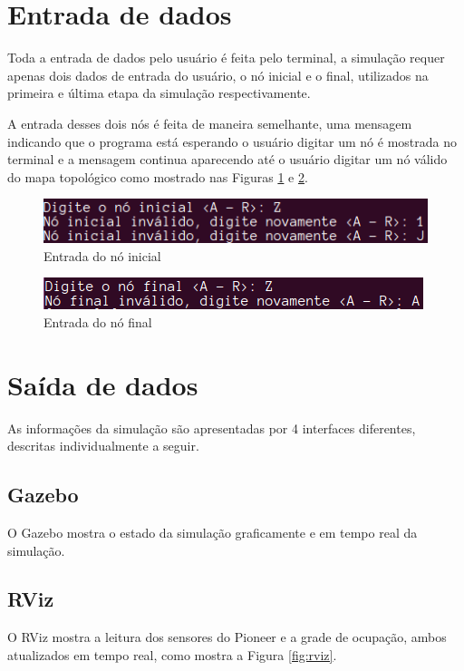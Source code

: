 \documentclass{llncs}
\begin{document}
\section{Entrada de dados} \label{sec:entrada}
Toda a entrada de dados pelo usuário é feita pelo terminal, a simulação requer apenas dois dados de entrada do usuário, o nó inicial e o final, utilizados na primeira e última etapa da simulação respectivamente.

A entrada desses dois nós é feita de maneira semelhante, uma mensagem indicando que o programa está esperando o usuário digitar um nó é mostrada no terminal e a mensagem continua aparecendo até o usuário digitar um nó válido do mapa topológico como mostrado nas Figuras \ref{fig:inicial} e \ref{fig:final}.

\begin{figure}[h]
	\centering
	\includegraphics[scale=0.75]{no_inicial}
	\caption{Entrada do nó inicial}
	\label{fig:inicial}
\end{figure}
\begin{figure}[h]
	\centering
	\includegraphics[scale=0.75]{no_final}
	\caption{Entrada do nó final}
	\label{fig:final}
\end{figure}


\section{Saída de dados} \label{sec:saida}
As informações da simulação são apresentadas por 4 interfaces diferentes, descritas individualmente a seguir.

\subsection{Gazebo}
O Gazebo mostra o estado da simulação graficamente e em tempo real da simulação.

\subsection{RViz}
O RViz mostra a leitura dos sensores do Pioneer e a grade de ocupação, ambos atualizados em tempo real, como mostra a Figura \ref{fig:rviz}.
\end{document}
